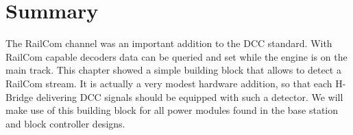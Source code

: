 
\section{Summary}

The RailCom channel was an important addition to the DCC standard. With RailCom capable decoders data can be queried and set while the engine is on the main track. This chapter showed a simple building block that allows to detect a RailCom stream. It is actually a very modest hardware addition, so that each H-Bridge delivering DCC signals should be equipped with such a detector. We will make use of this building block for all power modules found in the base station and block controller designs.
